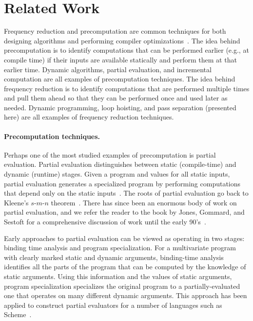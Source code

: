 
\section{Related Work}
\label{sec:related}

Frequency reduction and precomputation are common techniques for both
designing algorithms and performing compiler
optimizations~\cite{JS86-staging}.
%
The idea behind precomputation is to identify computations that can be
performed earlier (e.g., at compile time) if their inputs are
available statically and perform them at that earlier time. Dynamic
algorithms, partial evaluation, and incremental computation are all
examples of precomputation techniques.
%
The idea behind frequency
reduction is to identify computations that are performed multiple
times and pull them ahead so that they can be performed once and used
later as needed.  Dynamic programming, loop hoisting, and pass
separation (presented here) are all examples of frequency reduction
techniques.

\paragraph{Precomputation techniques.}
Perhaps one of the most studied examples of precomputation is
partial evaluation.  Partial evaluation distinguishes between static
(compile-time) and dynamic (runtime) stages. Given a program and values 
for all static inputs, partial evaluation generates a specialized program by
performing computations that depend only on the static
inputs~\cite{jones96}.  The roots of partial evaluation go back to
Kleene's $s$-$m$-$n$ theorem~\cite{Kleene52}.
There has since been an enormous body of work on partial evaluation,
and we refer the reader to the book by Jones, Gommard, and Sestoft for
a comprehensive discussion of work until the early 90's~\cite{JGS93}.

Early approaches to partial evaluation can be viewed as operating in
two stages: binding time analysis and program specialization.  For a
multivariate program with clearly marked static and dynamic arguments,
binding-time analysis identifies all the parts of the program that can
be computed by the knowledge of static arguments. Using this
information and the values of static arguments, program specialization
specializes the original program to a partially-evaluated one that
operates on many different dynamic arguments.  This approach has been
applied to construct partial evaluators for a number of languages such
as Scheme~\cite{OB91-Similix,Consel88-Schism}.

